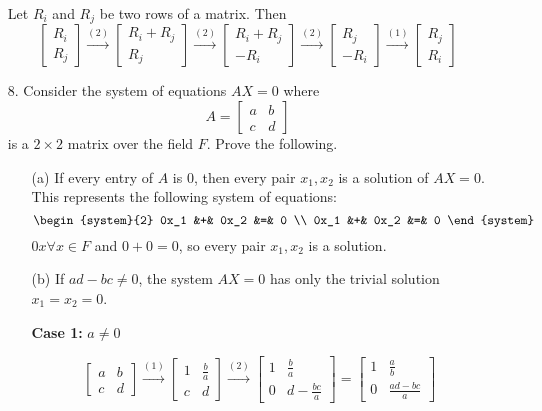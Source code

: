 \documentclass{article}
\begin{document}
\begin{enumerate}[listparindent=\parindent]
Let \(R_i\) and \(R_j\) be two rows of a matrix. Then
\[
    \begin{bmatrix}
        R_i \\ R_j
    \end{bmatrix}
    \xrightarrow{(2)}
    \begin{bmatrix}
        R_i + R_j \\ R_j
    \end{bmatrix}
    \xrightarrow{(2)}
    \begin{bmatrix}
        R_i + R_j \\ -R_i
    \end{bmatrix}
    \xrightarrow{(2)}
    \begin{bmatrix}
        R_j \\ -R_i
    \end{bmatrix}
    \xrightarrow{(1)}
    \begin{bmatrix}
        R_j \\ R_i
    \end{bmatrix}
\]

\item[8.] Consider the system of equations \(AX = 0\) where
    \[
        A = \begin{bmatrix}
            a & b \\ c & d
        \end{bmatrix}
    \] is a \(2 \times 2\) matrix over the field \(F\). Prove the following.

\begin{enumerate}[listparindent=\parindent]
\item[(a)] If every entry of \(A\) is 0, then every pair \(x_1, x_2\) is a solution of \(AX = 0\).
This represents the following system of equations:
\[
    \begin{system}{2}
        0x_1 &+& 0x_2 &=& 0 \\
        0x_1 &+& 0x_2 &=& 0
    \end{system}
\]
\(0x \forall x \in F\) and \(0 + 0 = 0\), so every pair \(x_1, x_2\) is a solution.

\item[(b)] If \(ad - bc \neq 0\), the system \(AX = 0\) has only the trivial solution \(x_1 = x_2 = 0\).

\textbf{Case 1:} \(a \neq 0\)

\[
    \begin{bmatrix}
        a & b \\
        c & d
    \end{bmatrix}
    \xrightarrow{(1)}
    \begin{bmatrix}
        1 & \frac{b}{a} \\
        c & d
    \end{bmatrix}
    \xrightarrow{(2)}
    \begin{bmatrix}
        1 & \frac{b}{a} \\
        0 & d - \frac{bc}{a}
    \end{bmatrix}
    =
    \begin{bmatrix}
        1 & \frac{a}{b} \\
        0 & \frac{ad - bc}{a}
    \end{bmatrix}
\]


\end{enumerate}
\end{enumerate}
\end{document}
